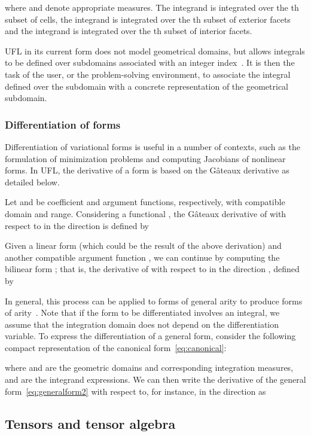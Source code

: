\documentclass[prodmode,acmtoms]{acmsmall}
\newcommand{\Gateaux}{G\^ateaux}
\begin{document}
where  and  denote appropriate measures. The integrand
 is integrated over the th subset  of
cells, the integrand  is integrated over the th subset
 of exterior facets and the integrand 
is integrated over the th subset  of interior
facets.

UFL in its current form does not model geometrical domains, but allows
integrals to be defined over subdomains associated with an integer
index~. It is then the task of the user, or the problem-solving
environment, to associate the integral defined over the subdomain 
with a concrete representation of the geometrical subdomain.

\subsubsection{Differentiation of forms}

Differentiation of variational forms is useful in a number of
contexts, such as the formulation of minimization problems and
computing Jacobians of nonlinear forms. In UFL, the derivative of a
form is based on the \Gateaux{} derivative as detailed below.

Let  and  be coefficient and argument functions, respectively,
with compatible domain and range. Considering a functional , the
\Gateaux{} derivative of  with respect to  in the direction  is
defined by

Given a linear form  (which could be the result of the above
derivation) and another compatible argument function , we can
continue by computing the bilinear form ; that
is, the derivative of  with respect to  in the direction ,
defined by

In general, this process can be applied to forms of general arity  to produce forms of arity~. Note that if the form to
be differentiated involves an integral, we assume that the integration
domain does not depend on the differentiation variable. To express
the differentiation of a general form, consider the following compact
representation of the canonical form~\eqref{eq:canonical}:

where  and  are the
geometric domains and corresponding integration measures, and
 are the integrand expressions. We can then write
the derivative of the general form~\eqref{eq:generalform2} with
respect to, for instance,  in the direction  as


\subsection{Tensors and tensor algebra}
\end{document}
